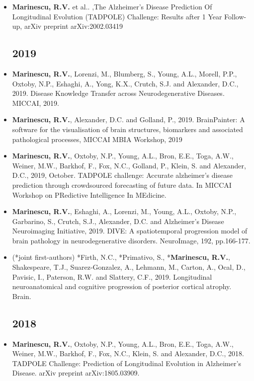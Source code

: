 \documentclass[a4paper,10pt]{article} %
\begin{document}
\newcommand{\poster}{\textcolor{red}{Poster}}
\newcommand{\talk}{\textcolor{darkgreen}{Talk}}
\newcommand{\journal}{\textcolor{blue}{Journal}}


\begin{itemize}
\subsection*{2020}
\item[\journal] \textbf{Marinescu, R.V.} et al.. ,The Alzheimer's Disease Prediction Of Longitudinal Evolution (TADPOLE) Challenge: Results after 1 Year Follow-up, arXiv preprint arXiv:2002.03419

\subsection*{2019}
\item[\poster] \textbf{Marinescu, R.V.}, Lorenzi, M., Blumberg, S., Young, A.L., Morell, P.P., Oxtoby, N.P., Eshaghi, A., Yong, K.X., Crutch, S.J. and Alexander, D.C., 2019. Disease Knowledge Transfer across Neurodegenerative Diseases. MICCAI, 2019.
\item[\talk] \textbf{Marinescu, R.V.}, Alexander, D.C. and Golland, P., 2019. BrainPainter: A software for the visualisation of brain structures, biomarkers and associated pathological processes, MICCAI MBIA Workshop, 2019
\item[\talk] \textbf{Marinescu, R.V.}, Oxtoby, N.P., Young, A.L., Bron, E.E., Toga, A.W., Weiner, M.W., Barkhof, F., Fox, N.C., Golland, P., Klein, S. and Alexander, D.C., 2019, October. TADPOLE challenge: Accurate alzheimer’s disease prediction through crowdsourced forecasting of future data. In MICCAI Workshop on PRedictive Intelligence In MEdicine.
\item[\journal] \textbf{Marinescu, R.V.}, Eshaghi, A., Lorenzi, M., Young, A.L., Oxtoby, N.P., Garbarino, S., Crutch, S.J., Alexander, D.C. and Alzheimer's Disease Neuroimaging Initiative, 2019. DIVE: A spatiotemporal progression model of brain pathology in neurodegenerative disorders. NeuroImage, 192, pp.166-177.
\item[\journal] (*joint first-authors) *Firth, N.C., *Primativo, S., *\textbf{Marinescu, R.V.}, Shakespeare, T.J., Suarez-Gonzalez, A., Lehmann, M., Carton, A., Ocal, D., Pavisic, I., Paterson, R.W. and Slattery, C.F., 2019. Longitudinal neuroanatomical and cognitive progression of posterior cortical atrophy. Brain.
\subsection*{2018}
\item[\journal] \textbf{Marinescu, R.V.}, Oxtoby, N.P., Young, A.L., Bron, E.E., Toga, A.W., Weiner, M.W., Barkhof, F., Fox, N.C., Klein, S. and Alexander, D.C., 2018. TADPOLE Challenge: Prediction of Longitudinal Evolution in Alzheimer's Disease. arXiv preprint arXiv:1805.03909.

\end{itemize}
\end{document}
